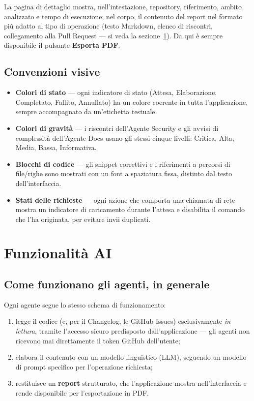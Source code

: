 \documentclass[11pt,a4paper]{article}
\begin{document}
La pagina di dettaglio mostra, nell'intestazione, repository, riferimento, ambito analizzato
e tempo di esecuzione; nel corpo, il contenuto del report nel formato più adatto al tipo di
operazione (testo Markdown, elenco di riscontri, collegamento alla Pull Request --- si veda
la sezione~\ref{sec:funzionalita-ai}). Da qui è sempre disponibile il pulsante
\textbf{Esporta PDF}.

\subsection{Convenzioni visive}

\begin{itemize}
  \item \textbf{Colori di stato} --- ogni indicatore di stato (Attesa, Elaborazione,
        Completato, Fallito, Annullato) ha un colore coerente in tutta l'applicazione,
        sempre accompagnato da un'etichetta testuale.
  \item \textbf{Colori di gravità} --- i riscontri dell'Agente Security e gli avvisi di
        complessità dell'Agente Docs usano gli stessi cinque livelli: Critica, Alta,
        Media, Bassa, Informativa.
  \item \textbf{Blocchi di codice} --- gli snippet correttivi e i riferimenti a percorsi di
        file/righe sono mostrati con un font a spaziatura fissa, distinto dal testo
        dell'interfaccia.
  \item \textbf{Stati delle richieste} --- ogni azione che comporta una chiamata di rete
        mostra un indicatore di caricamento durante l'attesa e disabilita il comando che
        l'ha originata, per evitare invii duplicati.
\end{itemize}

\newpage
\section{Funzionalità AI}
\label{sec:funzionalita-ai}

\subsection{Come funzionano gli agenti, in generale}

Ogni agente segue lo stesso schema di funzionamento:

\begin{enumerate}
  \item legge il codice (e, per il Changelog, le GitHub Issues) esclusivamente
        \emph{in lettura}, tramite l'accesso sicuro predisposto dall'applicazione --- gli
        agenti non ricevono mai direttamente il token GitHub dell'utente;
  \item elabora il contenuto con un modello linguistico (LLM), seguendo un modello di
        prompt specifico per l'operazione richiesta;
  \item restituisce un \textbf{report} strutturato, che l'applicazione mostra
        nell'interfaccia e rende disponibile per l'esportazione in PDF.
\end{enumerate}
\end{document}

